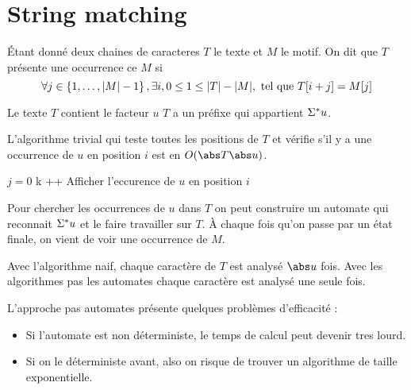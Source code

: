 \section{String matching}

\begin{definition}
	Étant donné deux chaines de caracteres $T$ le texte et $M$ le motif.
	On dit que $T$ présente une occurrence ce $M$ si
	$$\forall j \in \left\{1,\ldots,|M| -1\right\}, \exists i, 0 \leq 1 \leq |T| - |M|, \text{ tel que } T[i + j] = M[j]$$
\end{definition}

\begin{remarque}
	Le texte $T$ contient le facteur $u$ \ssi $T$ a un préfixe qui appartient $\Sigma^{*} u$.
\end{remarque}

\begin{remarque}
	L'algorithme trivial qui teste toutes les positions de $T$ et vérifie s'il y a une occurrence de $u$ en position $i$ est en $O(\abs T \abs u)$.

	\begin{algorithmic}[lines]
		\State $j = 0$
		\State k ++
		\EndIf
		\State Afficher l'eccurence de $u$ en position $i$
		\EndIf
		\EndFor
		\EndFunction
	\end{algorithmic}


\end{remarque}

\begin{remarque}
	Pour chercher les occurrences de $u$ dans $T$ on peut construire un automate qui reconnait $\Sigma^{*} u$ et le faire travailler sur $T$.
	À chaque fois qu'on passe par un état finale, on vient de voir une occurrence de $M$.
\end{remarque}

\begin{remarque}
	Avec l'algorithme naif, chaque caractère de $T$ est analysé $\abs u$ fois. Avec les algorithmes pas les automates chaque caractère est analysé une seule fois.
\end{remarque}

\begin{remarque}
	L'approche pas automates présente quelques problèmes d'efficacité :
	\begin{itemize}
		\item Si l'automate est non déterministe, le temps de calcul peut devenir tres lourd.
		\item Si on le déterministe avant, also on risque de trouver un algorithme de taille exponentielle.
	\end{itemize}
\end{remarque}

